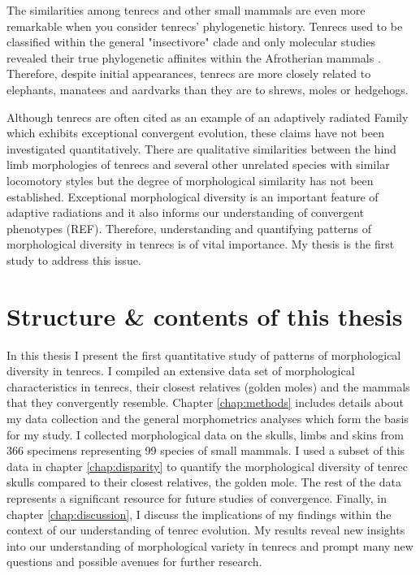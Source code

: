 	The similarities among tenrecs and other small mammals are even more remarkable when you consider tenrecs' phylogenetic history. Tenrecs used to be classified within the general "insectivore" clade and only molecular studies revealed their true phylogenetic affinites within the Afrotherian mammals \citep{Stanhope1998}. Therefore, despite initial appearances, tenrecs are more closely related to elephants, manatees and aardvarks than they are to shrews, moles or hedgehogs. 

	Although tenrecs are often cited as an example of an adaptively radiated Family which exhibits exceptional convergent evolution, these claims have not been investigated quantitatively. There are qualitative similarities between the hind limb morphologies of tenrecs and several other unrelated species with similar locomotory styles \citep{Salton2009} but the degree of morphological similarity has not been established. Exceptional morphological diversity is an important feature of adaptive radiations \citep{Losos2010a} and it also informs our understanding of convergent phenotypes (REF). Therefore, understanding and quantifying patterns of morphological diversity in tenrecs is of vital importance. My thesis is the first study to address this issue. 

\section{Structure \& contents of this thesis}
	
	In this thesis I present the first quantitative study of patterns of morphological diversity in tenrecs. I compiled an extensive data set of morphological characteristics in tenrecs, their closest relatives (golden moles) and the mammals that they convergently resemble. Chapter \ref{chap:methods} includes details about my data collection and the general morphometrics analyses which form the basis for my study. I collected morphological data on the skulls, limbs and skins from 366 specimens representing 99 species of small mammals. 
	I used a subset of this data in chapter \ref{chap:disparity} to quantify the morphological diversity of tenrec skulls compared to their closest relatives, the golden mole. The rest of the data represents a significant resource for future studies of convergence.
	Finally, in chapter \ref{chap:discussion}, I discuss the implications of my findings within the context of our understanding of tenrec evolution.	
 	My results reveal new insights into our understanding of morphological variety in tenrecs and prompt many new questions and possible avenues for further research.


